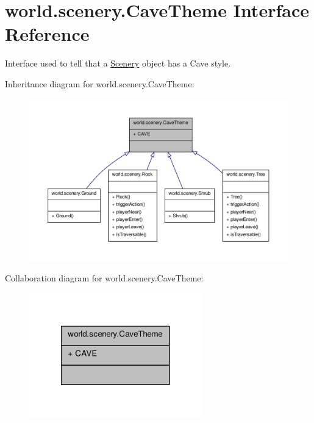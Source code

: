 \hypertarget{interfaceworld_1_1scenery_1_1_cave_theme}{\section{world.\-scenery.\-Cave\-Theme Interface Reference}
\label{interfaceworld_1_1scenery_1_1_cave_theme}
}


Interface used to tell that a \hyperlink{classworld_1_1scenery_1_1_scenery}{Scenery} object has a Cave style.  




Inheritance diagram for world.\-scenery.\-Cave\-Theme\-:
\nopagebreak
\begin{figure}[H]
\begin{center}
\leavevmode
\includegraphics[width=350pt]{interfaceworld_1_1scenery_1_1_cave_theme__inherit__graph}
\end{center}
\end{figure}


Collaboration diagram for world.\-scenery.\-Cave\-Theme\-:
\nopagebreak
\begin{figure}[H]
\begin{center}
\leavevmode
\includegraphics[width=212pt]{interfaceworld_1_1scenery_1_1_cave_theme__coll__graph}
\end{center}
\end{figure}

